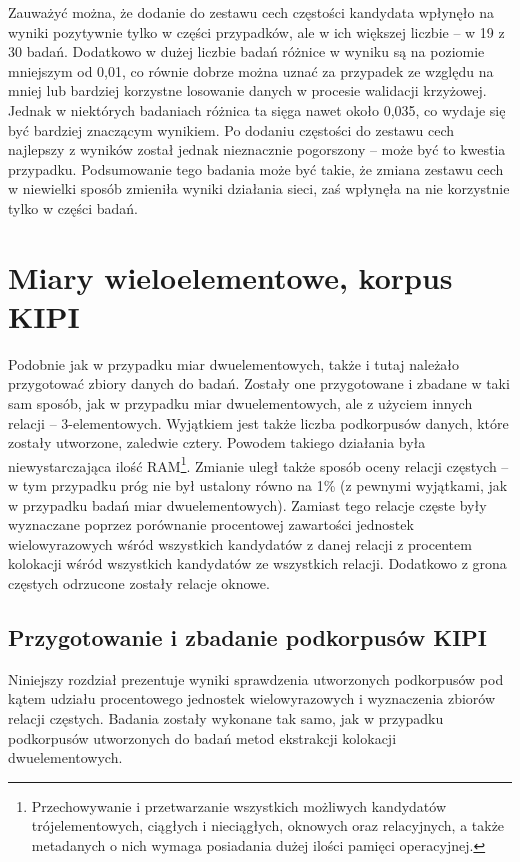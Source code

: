 Zauważyć można, że dodanie do zestawu cech częstości kandydata wpłynęło na wyniki pozytywnie tylko w części przypadków, ale w ich większej liczbie -- w 19 z 30 badań.
Dodatkowo w dużej liczbie badań różnice w wyniku są na poziomie mniejszym od 0,01, co równie dobrze można uznać za przypadek ze względu na mniej lub bardziej korzystne losowanie danych w procesie walidacji krzyżowej.
Jednak w niektórych badaniach różnica ta sięga nawet około 0,035, co wydaje się być bardziej znaczącym wynikiem.
Po dodaniu częstości do zestawu cech najlepszy z wyników został jednak nieznacznie pogorszony -- może być to kwestia przypadku.
Podsumowanie tego badania może być takie, że zmiana zestawu cech w niewielki sposób zmieniła wyniki działania sieci, zaś wpłynęła na nie korzystnie tylko w części badań.


\section{Miary wieloelementowe, korpus KIPI}
Podobnie jak w przypadku miar dwuelementowych, także i tutaj należało przygotować zbiory danych do badań.
Zostały one przygotowane i zbadane w taki sam sposób, jak w przypadku miar dwuelementowych, ale z użyciem innych relacji -- 3-elementowych.
Wyjątkiem jest także liczba podkorpusów danych, które zostały utworzone, zaledwie cztery.
Powodem takiego działania była niewystarczająca ilość RAM\footnote{Przechowywanie i przetwarzanie wszystkich możliwych kandydatów trójelementowych, ciągłych i nieciągłych, oknowych oraz relacyjnych, a także metadanych o nich wymaga posiadania dużej ilości pamięci operacyjnej.}.
Zmianie uległ także sposób oceny relacji częstych -- w tym przypadku próg nie był ustalony równo na 1\% (z pewnymi wyjątkami, jak w przypadku badań miar dwuelementowych).
Zamiast tego relacje częste były wyznaczane poprzez porównanie procentowej zawartości jednostek wielowyrazowych wśród wszystkich kandydatów z danej relacji z procentem kolokacji wśród wszystkich kandydatów ze wszystkich relacji.
Dodatkowo z grona częstych odrzucone zostały relacje oknowe.


\subsection{Przygotowanie i zbadanie podkorpusów KIPI} 
Niniejszy rozdział prezentuje wyniki sprawdzenia utworzonych podkorpusów pod kątem udziału procentowego jednostek wielowyrazowych i wyznaczenia zbiorów relacji częstych.
Badania zostały wykonane tak samo, jak w przypadku podkorpusów utworzonych do badań metod ekstrakcji kolokacji dwuelementowych.


